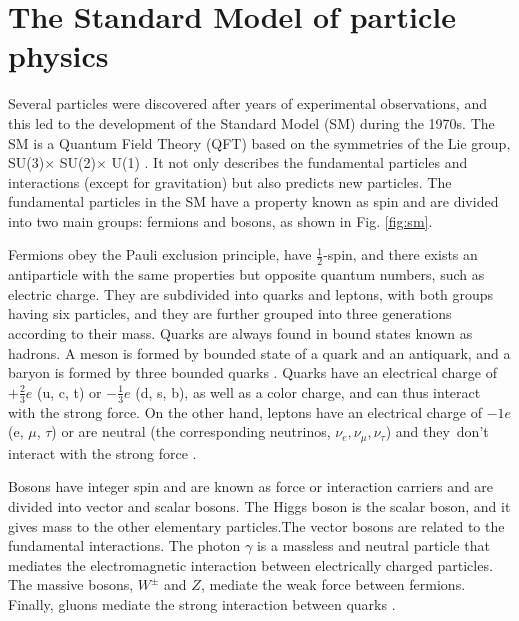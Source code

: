\chapter{\leavevmode\newline The Standard Model of particle physics}
\label{chap:chapter_1}
Several particles were discovered after years of experimental observations, and this led to the development of the Standard Model (SM) during the 1970s. The SM is a Quantum Field Theory (QFT) based on the symmetries of the Lie group, SU(3)$ \times$ SU(2)$ \times$ U(1) \cite{stiller2016full}. It not only describes the fundamental particles and interactions (except for gravitation) but also predicts new particles. The fundamental particles in the SM have a property known as spin and are divided into two main groups: fermions and bosons, as shown in Fig. \ref{fig:sm}.

Fermions obey the Pauli exclusion principle, have $\frac{1}{2}$-spin, and there exists an antiparticle with the same properties but opposite quantum numbers, such as electric charge. They are subdivided into quarks and leptons, with both groups having six particles, and they are further grouped into three generations according to their mass. Quarks are always found in bound states known as hadrons. A meson is formed by bounded state of a quark and an antiquark, and a baryon is formed by three bounded quarks \cite{stiller2016full, fedi2016studies, grummer2021search}. Quarks have an electrical charge of $+\frac{2}{3}e$ (u, c, t) or $-\frac{1}{3}e$ (d, s, b), as well as a color charge, and can thus interact with the strong force. On the other hand, leptons have an electrical charge of $-1e$ (e, $\mu$, $\tau$) or are neutral (the corresponding neutrinos, $\nu_e, \nu_\mu, \nu_\tau$) and they don't interact with the strong force \cite{bonanomi2021response, bragagnolo2021measurement}.

Bosons have integer spin and are known as force or interaction carriers and are divided into vector and scalar bosons. The Higgs boson is the scalar boson, and it gives mass to the other elementary particles.The vector bosons are related to the fundamental interactions. The photon $\gamma$ is a massless and neutral particle that mediates the electromagnetic interaction between electrically charged particles. The massive bosons, $W^{\pm}$ and $Z$, mediate the weak force between fermions. Finally, gluons mediate the strong interaction between quarks \cite{grummer2021search, bragagnolo2021measurement}.

